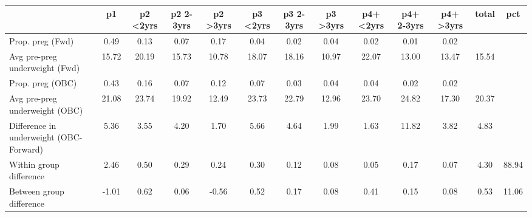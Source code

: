 \begin{tabular}{l*{12}{c}}
\toprule
            &\multicolumn{1}{c}{p1}&\multicolumn{1}{c}{p2 \textless2yrs}&\multicolumn{1}{c}{p2 2-3yrs}&\multicolumn{1}{c}{p2 \textgreater3yrs}&\multicolumn{1}{c}{p3 \textless2yrs}&\multicolumn{1}{c}{p3 2-3yrs}&\multicolumn{1}{c}{p3 \textgreater3yrs}&\multicolumn{1}{c}{p4+ \textless2yrs}&\multicolumn{1}{c}{p4+ 2-3yrs}&\multicolumn{1}{c}{p4+ \textgreater3yrs}&\multicolumn{1}{c}{total}&\multicolumn{1}{c}{pct}\\
\midrule
\midrule
Prop. preg (Fwd)&        0.49&        0.13&        0.07&        0.17&        0.04&        0.02&        0.04&        0.02&        0.01&        0.02&            &            \\
Avg pre-preg underweight (Fwd)&       15.72&       20.19&       15.73&       10.78&       18.07&       18.16&       10.97&       22.07&       13.00&       13.47&       15.54&            \\
Prop. preg (OBC)&        0.43&        0.16&        0.07&        0.12&        0.07&        0.03&        0.04&        0.04&        0.02&        0.02&            &            \\
Avg pre-preg underweight (OBC)&       21.08&       23.74&       19.92&       12.49&       23.73&       22.79&       12.96&       23.70&       24.82&       17.30&       20.37&            \\
Difference in underweight (OBC-Forward)&        5.36&        3.55&        4.20&        1.70&        5.66&        4.64&        1.99&        1.63&       11.82&        3.82&        4.83&            \\
Within group difference&        2.46&        0.50&        0.29&        0.24&        0.30&        0.12&        0.08&        0.05&        0.17&        0.07&        4.30&       88.94\\
Between group difference&       -1.01&        0.62&        0.06&       -0.56&        0.52&        0.17&        0.08&        0.41&        0.15&        0.08&        0.53&       11.06\\
\bottomrule
\end{tabular}
